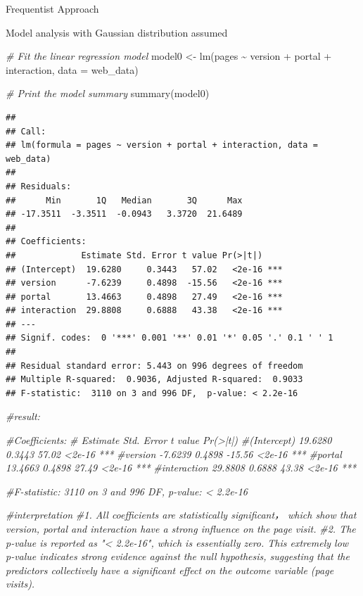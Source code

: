 \documentclass[
  ignorenonframetext,
]{beamer}
\newenvironment{Shaded}{\begin{snugshade}}{\end{snugshade}}
\newcommand{\AttributeTok}[1]{\textcolor[rgb]{0.77,0.63,0.00}{#1}}
\newcommand{\CommentTok}[1]{\textcolor[rgb]{0.56,0.35,0.01}{\textit{#1}}}
\newcommand{\FunctionTok}[1]{\textcolor[rgb]{0.00,0.00,0.00}{#1}}
\newcommand{\NormalTok}[1]{#1}
\newcommand{\OtherTok}[1]{\textcolor[rgb]{0.56,0.35,0.01}{#1}}
\newcommand{\SpecialCharTok}[1]{\textcolor[rgb]{0.00,0.00,0.00}{#1}}
\begin{document}
\begin{frame}[fragile]{Frequentist Approach}
\begin{block}{Model analysis with Gaussian distribution assumed}
\begin{Shaded}
\begin{Highlighting}[]
\CommentTok{\# Fit the linear regression model}
\NormalTok{model0 }\OtherTok{\textless{}{-}} \FunctionTok{lm}\NormalTok{(pages }\SpecialCharTok{\textasciitilde{}}\NormalTok{ version }\SpecialCharTok{+}\NormalTok{ portal }\SpecialCharTok{+}\NormalTok{ interaction, }\AttributeTok{data =}\NormalTok{ web\_data)}

\CommentTok{\# Print the model summary}
\FunctionTok{summary}\NormalTok{(model0)}
\end{Highlighting}
\end{Shaded}

\begin{verbatim}
## 
## Call:
## lm(formula = pages ~ version + portal + interaction, data = web_data)
## 
## Residuals:
##      Min       1Q   Median       3Q      Max 
## -17.3511  -3.3511  -0.0943   3.3720  21.6489 
## 
## Coefficients:
##             Estimate Std. Error t value Pr(>|t|)    
## (Intercept)  19.6280     0.3443   57.02   <2e-16 ***
## version      -7.6239     0.4898  -15.56   <2e-16 ***
## portal       13.4663     0.4898   27.49   <2e-16 ***
## interaction  29.8808     0.6888   43.38   <2e-16 ***
## ---
## Signif. codes:  0 '***' 0.001 '**' 0.01 '*' 0.05 '.' 0.1 ' ' 1
## 
## Residual standard error: 5.443 on 996 degrees of freedom
## Multiple R-squared:  0.9036, Adjusted R-squared:  0.9033 
## F-statistic:  3110 on 3 and 996 DF,  p-value: < 2.2e-16
\end{verbatim}

\begin{Shaded}
\begin{Highlighting}[]
\CommentTok{\#result:}

\CommentTok{\#Coefficients:}
\CommentTok{\#            Estimate Std. Error t value Pr(\textgreater{}|t|)    }
\CommentTok{\#(Intercept)  19.6280     0.3443   57.02   \textless{}2e{-}16 ***}
\CommentTok{\#version      {-}7.6239     0.4898  {-}15.56   \textless{}2e{-}16 ***}
\CommentTok{\#portal       13.4663     0.4898   27.49   \textless{}2e{-}16 ***}
\CommentTok{\#interaction  29.8808     0.6888   43.38   \textless{}2e{-}16 ***}

\CommentTok{\#F{-}statistic:  3110 on 3 and 996 DF,  p{-}value: \textless{} 2.2e{-}16}

\CommentTok{\#interpretation}
\CommentTok{\#1. All coefficients are statistically significant， which show that version, portal and interaction have a strong influence on the page visit.}
\CommentTok{\#2. The p{-}value is reported as "\textless{} 2.2e{-}16", which is essentially zero. This extremely low p{-}value indicates strong evidence against the null hypothesis, suggesting that the predictors collectively have a significant effect on the outcome variable (page visits).}
\end{Highlighting}
\end{Shaded}
\end{block}


\end{frame}
\end{document}
